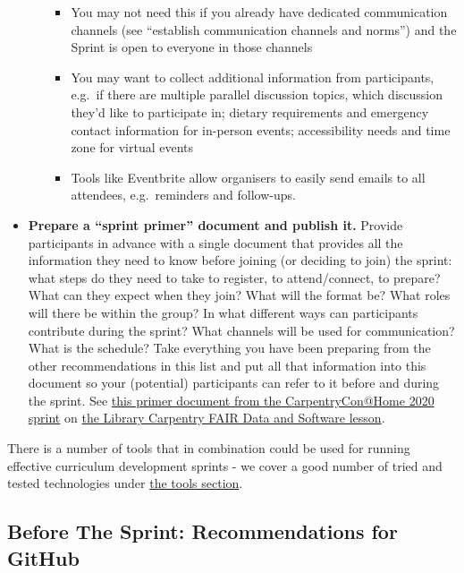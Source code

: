 \documentclass[
]{book}
\providecommand{\tightlist}{%
  \setlength{\itemsep}{0pt}\setlength{\parskip}{0pt}}
\begin{document}
\begin{itemize}
\begin{itemize}
    \begin{itemize}
    \tightlist
    \item
      You may not need this if you already have dedicated communication channels (see ``establish communication channels and norms'') and the Sprint is open to everyone in those channels
    \item
      You may want to collect additional information from participants, e.g.~if there are multiple parallel discussion topics, which discussion they'd like to participate in; dietary requirements and emergency contact information for in-person events; accessibility needs and time zone for virtual events
    \item
      Tools like Eventbrite allow organisers to easily send emails to all attendees, e.g.~reminders and follow-ups.
    \end{itemize}
  \end{itemize}
\item
  \textbf{Prepare a ``sprint primer'' document and publish it.}
  Provide participants in advance with a single document that provides all the information they need to know before joining (or deciding to join) the sprint:
  what steps do they need to take to register,
  to attend/connect,
  to prepare?
  What can they expect when they join?
  What will the format be?
  What roles will there be within the group?
  In what different ways can participants contribute during the sprint?
  What channels will be used for communication?
  What is the schedule?
  Take everything you have been preparing from the other recommendations in this list and put all that information into this document so your (potential) participants can refer to it before and during the sprint.
  See \href{https://docs.google.com/document/d/1IwnClDjruY9yLmJEUjz-JvRptxqaLsiOTieUlgVbry8/edit?usp=sharing}{this primer document from the CarpentryCon@Home 2020 sprint}
  on \href{https://librarycarpentry.org/lc-fair-research/}{the Library Carpentry FAIR Data and Software lesson}.
\end{itemize}

There is a number of tools that in combination could be used for running effective curriculum development sprints - we cover a good number of tried and tested technologies under \protect\hyperlink{tools-and-resources}{the tools section}.

\hypertarget{before-the-sprint-recommendations-for-github}{%
\subsection{Before The Sprint: Recommendations for GitHub}\label{before-the-sprint-recommendations-for-github}}
\end{document}
